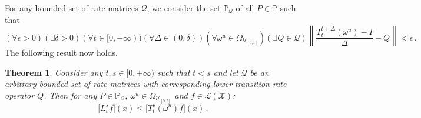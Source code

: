 \documentclass[a4paper,reqno]{amsart}
\newtheorem{theorem}{Theorem}
\newcommand{\states}{\mathcal{X}}
\newcommand{\gambles}{\mathcal{L}}
\newcommand{\gamblesX}{\gambles(\states)}
\newcommand{\lrate}{\underline{Q}}
\newcommand{\norm}[1]{\left\lVert #1 \right\rVert}
\begin{document}
For any bounded set of rate matrices $\mathcal{Q}$, we consider the set $\mathbb{P}_\mathcal{Q}$ of all $P\in\mathbb{P}$ such that
\begin{equation*}
(\forall\epsilon>0)(\exists\delta>0)(\forall t\in[0,+\infty))(\forall\Delta\in(0,\delta))(\forall\omega^u\in\Omega_{\mathcal{U}_{[0,t]}})(\exists Q\in\mathcal{Q})\norm{\frac{T_t^{t+\Delta}(\omega^u)-I}{\Delta}-Q}<\epsilon\,.
\end{equation*}
The following result now holds.
\begin{theorem}
Consider any $t,s\in[0,+\infty)$ such that $t<s$ and let $\mathcal{Q}$ be an arbitrary bounded set of rate matrices with corresponding lower transition rate operator $\lrate$. Then for any $P\in\mathbb{P}_\mathcal{Q}$, $\omega^u\in\Omega_{\mathcal{U}_{[0,t]}}$ and $f\in\gamblesX$:
\begin{equation*}
\bigl[L_t^sf\bigr](x) \leq \bigl[T_t^s(\omega^u)f\bigr](x)\,.
\end{equation*}
\end{theorem}
\end{document}
